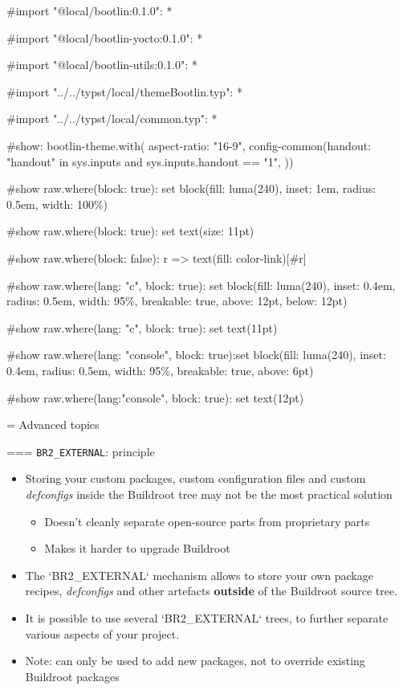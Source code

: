 #import "@local/bootlin:0.1.0": *

#import "@local/bootlin-yocto:0.1.0": *

#import "@local/bootlin-utils:0.1.0": *

#import "../../typst/local/themeBootlin.typ": *

#import "../../typst/local/common.typ": *

#show: bootlin-theme.with( aspect-ratio: "16-9", config-common(handout: "handout" in sys.inputs and sys.inputs.handout == "1", ))

#show raw.where(block: true): set block(fill: luma(240), inset: 1em, radius: 0.5em, width: 100\%)

#show raw.where(block: true): set text(size: 11pt)

#show raw.where(block: false): r => text(fill: color-link)[#r]

#show raw.where(lang: "c", block: true): set block(fill: luma(240), inset: 0.4em, radius: 0.5em, width: 95\%, breakable: true, above: 12pt, below: 12pt)

#show raw.where(lang: "c", block: true): set text(11pt)

#show raw.where(lang: "console", block: true):set block(fill: luma(240), inset: 0.4em, radius: 0.5em, width: 95\%, breakable: true, above: 6pt)

#show raw.where(lang:"console", block: true): set text(12pt)

 = Advanced topics

=== {{\tt BR2\_EXTERNAL}: principle}
  \begin{itemize}
  \item Storing your custom packages, custom configuration files and
    custom {\em defconfigs} inside the Buildroot tree may not be the
    most practical solution
    \begin{itemize}
    \item Doesn't cleanly separate open-source parts from proprietary parts
    \item Makes it harder to upgrade Buildroot
    \end{itemize}
  \item The `BR2_EXTERNAL` mechanism allows to store your own
    package recipes, {\em defconfigs} and other artefacts {\bf
      outside} of the Buildroot source tree.
  \item It is possible to use several `BR2_EXTERNAL` trees, to
    further separate various aspects of your project.
  \item Note: can only be used to add new packages, not to override
    existing Buildroot packages
  \end{itemize}


